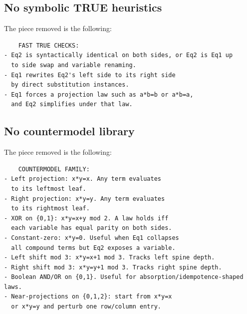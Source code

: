 \documentclass{article}
\begin{document}
\subsection{No symbolic TRUE heuristics}
\label{appendix:no_symbolic_true_heuristics_cheatsheet}

The piece removed is the following:
\begin{verbatim}
    FAST TRUE CHECKS:
- Eq2 is syntactically identical on both sides, or Eq2 is Eq1 up
  to side swap and variable renaming.
- Eq1 rewrites Eq2's left side to its right side
  by direct substitution instances.
- Eq1 forces a projection law such as a*b=b or a*b=a,
  and Eq2 simplifies under that law.
\end{verbatim}
\newpage
\subsection{No countermodel library}
\label{appendix:no_countermodel_library_cheatsheet}

The piece removed is the following:
\begin{verbatim}
    COUNTERMODEL FAMILY:
- Left projection: x*y=x. Any term evaluates 
  to its leftmost leaf.
- Right projection: x*y=y. Any term evaluates
  to its rightmost leaf.
- XOR on {0,1}: x*y=x+y mod 2. A law holds iff
  each variable has equal parity on both sides.
- Constant-zero: x*y=0. Useful when Eq1 collapses
  all compound terms but Eq2 exposes a variable.
- Left shift mod 3: x*y=x+1 mod 3. Tracks left spine depth.
- Right shift mod 3: x*y=y+1 mod 3. Tracks right spine depth.
- Boolean AND/OR on {0,1}. Useful for absorption/idempotence-shaped laws.
- Near-projections on {0,1,2}: start from x*y=x
  or x*y=y and perturb one row/column entry.
\end{verbatim}
\end{document}
